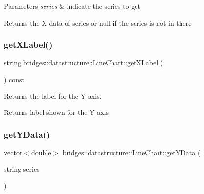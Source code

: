 \begin{DoxyParams}{Parameters}
{\em series} & indicate the series to get \\
\hline
\end{DoxyParams}
\begin{DoxyReturn}{Returns}
the X data of series or null if the series is not in there 
\end{DoxyReturn}
\mbox{\label{classbridges_1_1datastructure_1_1_line_chart_aba75962040195f35f8801714e050ad91}} 
\subsubsection{\texorpdfstring{get\+X\+Label()}{getXLabel()}}
{\footnotesize\ttfamily string bridges\+::datastructure\+::\+Line\+Chart\+::get\+X\+Label (\begin{DoxyParamCaption}{ }\end{DoxyParamCaption}) const\hspace{0.3cm}{\ttfamily [inline]}}



Returns the label for the Y-\/axis. 

\begin{DoxyReturn}{Returns}
label shown for the Y-\/axis 
\end{DoxyReturn}
\mbox{\label{classbridges_1_1datastructure_1_1_line_chart_a6a895cf47836585f8415e4d29e092085}} 
\subsubsection{\texorpdfstring{get\+Y\+Data()}{getYData()}}
{\footnotesize\ttfamily vector$<$double$>$ bridges\+::datastructure\+::\+Line\+Chart\+::get\+Y\+Data (\begin{DoxyParamCaption}\item[{string}]{series }\end{DoxyParamCaption})\hspace{0.3cm}{\ttfamily [inline]}}



